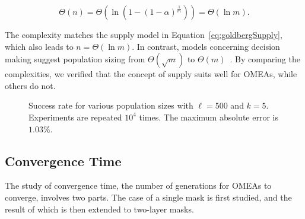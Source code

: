 \documentclass{sig-alternate}
\begin{document}
\begin{equation*}
\Theta\left(n\right)=\Theta\left(\ln\left(1-\left(1-\alpha\right)^\frac{1}{m}\right)\right) = \Theta\left(\ln m\right).
\end{equation*}

The complexity matches the supply model in Equation~\ref{eq:goldbergSupply}, which also leads to $n=\Theta\left(\ln m\right)$.
In contrast,
models concerning decision making suggest population sizing from $\Theta\left(\sqrt{m}\right)$ to $\Theta\left(m\right)$~\cite{1992_Goldberg, 1999_Gamblers}.
By comparing the complexities, we verified that the concept of supply suits well for OMEAs, while others do not.

%

\begin{figure}%
\centering
{}
\caption{
Success rate for various population sizes with $\ell =500$ and $k=5$.
Experiments are repeated $10^4$ times.
The maximum absolute error is $1.03\%$.
}
\label{fig:supply}
\end{figure}

\subsection{Convergence Time}

The study of convergence time, the number of generations for OMEAs to converge, involves two parts.
The case of a single mask is first studied,
and the result of which is then extended to two-layer masks.
\end{document}
